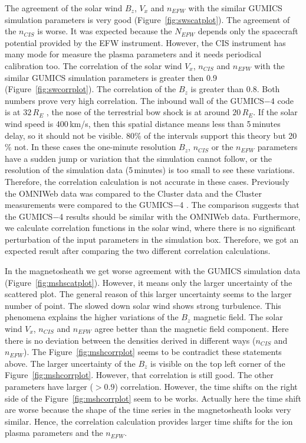 \documentclass[linenumbers,draft]{agujournal}
\begin{document}
The agreement of the solar wind $B_{z}$, $V_{x}$ and $n_{EFW}$ with the similar GUMICS simulation parameters is very good (Figure~\ref{fig:swscatplot}). The agreement of the $n_{CIS}$ is worse. It was expected because the $N_{EFW}$ depends only the spacecraft potential provided by the EFW instrument. However, the CIS instrument has many mode for measure the plasma parameters and it needs periodical calibration too. The correlation of the solar wind $V_{x}$,  $n_{CIS}$ and $n_{EFW}$ with the similar GUMICS simulation parameters is greater then 0.9 (Figure~\ref{fig:swcorrplot}). The correlation of the $B_{z}$ is greater than 0.8. Both numbers prove very high correlation. The inbound wall of the GUMICS$-$4 code is at $32\,R_E$ \citep{janhunen12:_gumic_mhd}, the nose of the terrestrial bow shock is at around $20\,R_E$. If the solar wind speed is 400\,km/s, then this spatial distance means less than 5\,minutes delay, so it should not be visible. 80\% of the intervals support this theory but 20\,\% not. In these cases the one-minute resolution $B_z$, $n_{CIS}$ or the $n_{EFW}$ parameters have a sudden jump or variation that the simulation cannot follow, or the resolution of the simulation data (5\,minutes) is too small to see these variations. Therefore, the correlation calculation is not accurate in these cases. Previously the OMNIWeb data was compared to the Cluster data and the Cluster measurements were compared to the GUMICS$-$4 \citep{facsko16:_one_earth}. The comparison suggests that the GUMICS$-$4 results should be similar with the OMNIWeb data. Furthermore, we calculate correlation functions in the solar wind, where there is no significant perturbation of the input parameters in the simulation box. Therefore, we got an expected result after comparing the two different correlation calculations.

In the magnetosheath we get worse agreement with the GUMICS simulation data (Figure~\ref{fig:mshscatplot}). However, it means only the larger uncertainty of the scattered plot. The general reason of this larger uncertainty seems to the larger number of point. The slowed down solar wind shows strong turbulence. This phenomena explains the higher variations of the $B_{z}$ magnetic field. The solar wind $V_{x}$, $n_{CIS}$ and $n_{EFW}$ agree better than the magnetic field component. Here there is no deviation between the densities derived in different ways ($n_{CIS}$ and $n_{EFW}$). The Figure~\ref{fig:mshcorrplot} seems to be contradict these statements above. The larger uncertainty of the $B_{z}$ is visible on the top left corner of the Figure~\ref{fig:mshcorrplot}. However, that correlation is still good. The other parameters have larger ($>0.9$) correlation. However, the time shifts on the right side of the Figure~\ref{fig:mshcorrplot} seem to be works. Actually here the time shift are worse because the shape of the time series in the magnetosheath looks very similar. Hence, the correlation calculation provides larger time shifts for the ion plasma parameters and the $n_{EFW}$. 
\end{document}
